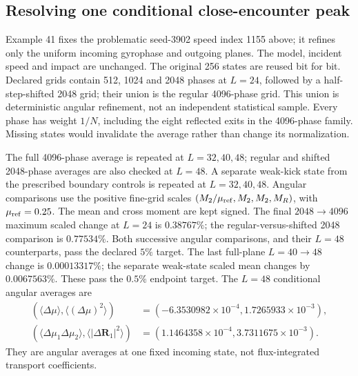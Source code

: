 \documentclass[11pt,letterpaper]{article}
\begin{document}
\subsection*{Resolving one conditional close-encounter peak}
Example 41 fixes the problematic seed-3902 speed index 1155 above;
it refines only the uniform incoming gyrophase and outgoing planes.
The model, incident speed and impact are unchanged. The original
256 states are reused bit for bit. Declared grids contain 512, 1024
and 2048 phases at $L=24$, followed by a half-step-shifted 2048 grid;
their union is the regular 4096-phase grid. This union is deterministic
angular refinement, not an independent statistical sample. Every
phase has weight $1/N$, including the eight reflected exits in the
4096-phase family. Missing states would invalidate the average rather
than change its normalization.

The full 4096-phase average is repeated at $L=32,40,48$; regular and
shifted 2048-phase averages are also checked at $L=48$. A separate
weak-kick state from the prescribed boundary controls is repeated at
$L=32,40,48$. Angular comparisons use the positive fine-grid scales
$(M_2/\mu_{\rm ref},M_2,M_2,M_R)$, with $\mu_{\rm ref}=0.25$.
The mean and cross moment are kept signed. The final $2048\to4096$
maximum scaled change at $L=24$ is $0.38767\%$; the regular-versus-shifted
2048 comparison is $0.77534\%$. Both successive angular comparisons,
and their $L=48$ counterparts, pass the declared $5\%$ target.
The last full-plane $L=40\to48$ change is $0.00013317\%$; the separate
weak-state scaled mean changes by $0.0067563\%$. These pass the
$0.5\%$ endpoint target. The $L=48$ conditional angular averages are
\[
\begin{aligned}
 (\langle\Delta\mu\rangle,\langle(\Delta\mu)^2\rangle)
   &=(-6.3530982\times10^{-4},1.7265933\times10^{-3}),\\
 (\langle\Delta\mu_1\Delta\mu_2\rangle,\langle|\Delta\bm R_1|^2\rangle)
   &=(1.1464358\times10^{-4},3.7311675\times10^{-3}).
\end{aligned}
\]
They are angular averages at one fixed incoming state, not
flux-integrated transport coefficients.
\end{document}
